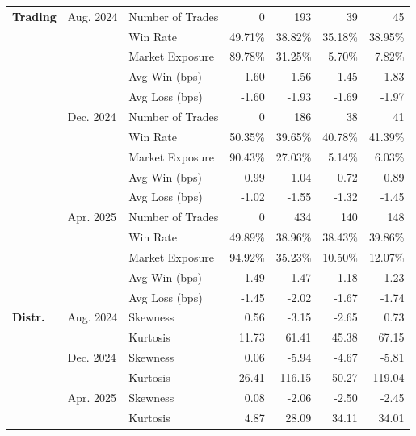 \begin{table}[H]
{\begin{tabular*}{\textwidth}{@{\extracolsep{\fill}} l l l r r r r}
\textbf{Trading}
& Aug. 2024 & Number of Trades          & 0       & 193       & 39       & 45 \\
&           & Win Rate                  & 49.71\% & 38.82\%   & 35.18\%  & 38.95\% \\
&           & Market Exposure           & 89.78\% & 31.25\%   & 5.70\%   & 7.82\% \\
&           & Avg Win (bps)             & 1.60    & 1.56      & 1.45     & 1.83 \\
&           & Avg Loss (bps)            & -1.60   & -1.93     & -1.69    & -1.97 \\
& Dec. 2024 & Number of Trades          & 0       & 186       & 38       & 41 \\
&           & Win Rate                  & 50.35\% & 39.65\%   & 40.78\%  & 41.39\% \\
&           & Market Exposure           & 90.43\% & 27.03\%   & 5.14\%   & 6.03\% \\
&           & Avg Win (bps)             & 0.99    & 1.04      & 0.72     & 0.89 \\
&           & Avg Loss (bps)            & -1.02   & -1.55     & -1.32    & -1.45 \\
& Apr. 2025 & Number of Trades          & 0        & 434       & 140       & 148 \\
&           & Win Rate                  & 49.89\%  & 38.96\%   & 38.43\%   & 39.86\% \\
&           & Market Exposure           & 94.92\%  & 35.23\%   & 10.50\%   & 12.07\% \\
&           & Avg Win (bps)             & 1.49     & 1.47      & 1.18      & 1.23 \\
&           & Avg Loss (bps)            & -1.45    & -2.02     & -1.67     & -1.74 \\
\midrule

\textbf{Distr.}
& Aug. 2024 & Skewness                  & 0.56    & -3.15     & -2.65    & 0.73 \\
&           & Kurtosis                  & 11.73   & 61.41     & 45.38    & 67.15 \\
& Dec. 2024 & Skewness                  & 0.06    & -5.94     & -4.67    & -5.81 \\
&           & Kurtosis                  & 26.41   & 116.15    & 50.27    & 119.04 \\
& Apr. 2025 & Skewness                  & 0.08     & -2.06     & -2.50     & -2.45 \\
&           & Kurtosis                  & 4.87     & 28.09     & 34.11     & 34.01 \\


\end{tabular*}}
\end{table}
